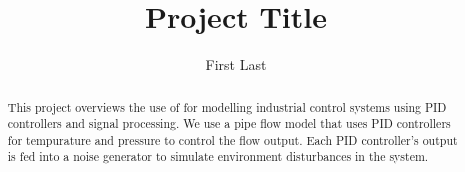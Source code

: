 \documentclass[a4paper,titlepage]{article}
\begin{document}
\title{Project Title}
\author{First Last}
\maketitle

\begin{abstract}
	This project overviews the use of \Labview for modelling industrial control
	systems using PID controllers and signal processing. We use a pipe flow model
	that uses PID controllers for tempurature and pressure to control the flow
	output. Each PID controller's output is fed into a noise generator to simulate
	environment disturbances in the system.
\end{abstract}

\tableofcontents
\listoftables
\listoffigures

\pagebreak


\end{document}
